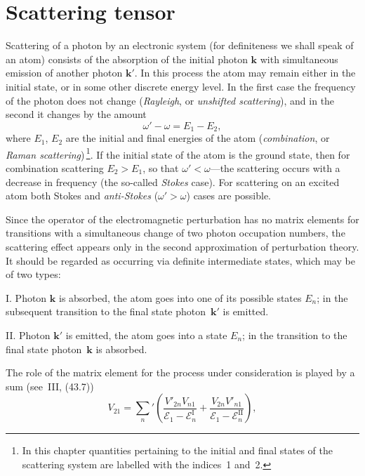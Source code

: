\section{Scattering tensor}

Scattering of a photon by an electronic system (for definiteness we shall speak of an atom) consists of the absorption of the initial photon $\mathbf{k}$ with simultaneous emission of another photon $\mathbf{k}'$. In this process the atom may remain either in the initial state, or in some other discrete energy level. In the first case the frequency of the photon does not change (\textit{Rayleigh}, or \textit{unshifted scattering}), and in the second it changes by the amount
\begin{equation}
\omega' - \omega = E_1 - E_2,
\tag{59.1}
\end{equation}
where $E_1$, $E_2$ are the initial and final energies of the atom (\textit{combination}, or \textit{Raman scattering})\,\footnote{In this chapter quantities pertaining to the initial and final states of the scattering system are labelled with the indices~1 and~2.}. If the initial state of the atom is the ground state, then for combination scattering $E_2 > E_1$, so that $\omega' < \omega$---the scattering occurs with a decrease in frequency (the so-called \textit{Stokes} case). For scattering on an excited atom both Stokes and \textit{anti-Stokes} ($\omega' > \omega$) cases are possible.

Since the operator of the electromagnetic perturbation has no matrix elements for transitions with a simultaneous change of two photon occupation numbers, the scattering effect appears only in the second approximation of perturbation theory. It should be regarded as occurring via definite intermediate states, which may be of two types:

I. Photon $\mathbf{k}$ is absorbed, the atom goes into one of its possible states $E_n$; in the subsequent transition to the final state photon~$\mathbf{k}'$ is emitted.

II. Photon $\mathbf{k}'$ is emitted, the atom goes into a state $E_n$; in the transition to the final state photon~$\mathbf{k}$ is absorbed.

The role of the matrix element for the process under consideration is played by a sum (see~III, (43.7))
\begin{equation}
V_{21} = \sum_n{}'\left(\frac{V'_{2n}V_{n1}}{\mathcal{E}_1 - \mathcal{E}^{\mathrm{I}}_n} + \frac{V_{2n}V'_{n1}}{\mathcal{E}_1 - \mathcal{E}^{\mathrm{II}}_n}\right),
\tag{59.2}
\end{equation}

